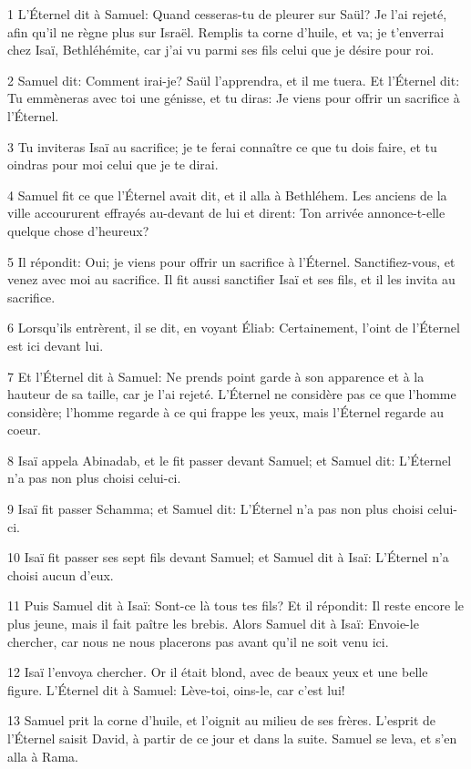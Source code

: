 \par 1 L'Éternel dit à Samuel: Quand cesseras-tu de pleurer sur Saül? Je l'ai rejeté, afin qu'il ne règne plus sur Israël. Remplis ta corne d'huile, et va; je t'enverrai chez Isaï, Bethléhémite, car j'ai vu parmi ses fils celui que je désire pour roi.
\par 2 Samuel dit: Comment irai-je? Saül l'apprendra, et il me tuera. Et l'Éternel dit: Tu emmèneras avec toi une génisse, et tu diras: Je viens pour offrir un sacrifice à l'Éternel.
\par 3 Tu inviteras Isaï au sacrifice; je te ferai connaître ce que tu dois faire, et tu oindras pour moi celui que je te dirai.
\par 4 Samuel fit ce que l'Éternel avait dit, et il alla à Bethléhem. Les anciens de la ville accoururent effrayés au-devant de lui et dirent: Ton arrivée annonce-t-elle quelque chose d'heureux?
\par 5 Il répondit: Oui; je viens pour offrir un sacrifice à l'Éternel. Sanctifiez-vous, et venez avec moi au sacrifice. Il fit aussi sanctifier Isaï et ses fils, et il les invita au sacrifice.
\par 6 Lorsqu'ils entrèrent, il se dit, en voyant Éliab: Certainement, l'oint de l'Éternel est ici devant lui.
\par 7 Et l'Éternel dit à Samuel: Ne prends point garde à son apparence et à la hauteur de sa taille, car je l'ai rejeté. L'Éternel ne considère pas ce que l'homme considère; l'homme regarde à ce qui frappe les yeux, mais l'Éternel regarde au coeur.
\par 8 Isaï appela Abinadab, et le fit passer devant Samuel; et Samuel dit: L'Éternel n'a pas non plus choisi celui-ci.
\par 9 Isaï fit passer Schamma; et Samuel dit: L'Éternel n'a pas non plus choisi celui-ci.
\par 10 Isaï fit passer ses sept fils devant Samuel; et Samuel dit à Isaï: L'Éternel n'a choisi aucun d'eux.
\par 11 Puis Samuel dit à Isaï: Sont-ce là tous tes fils? Et il répondit: Il reste encore le plus jeune, mais il fait paître les brebis. Alors Samuel dit à Isaï: Envoie-le chercher, car nous ne nous placerons pas avant qu'il ne soit venu ici.
\par 12 Isaï l'envoya chercher. Or il était blond, avec de beaux yeux et une belle figure. L'Éternel dit à Samuel: Lève-toi, oins-le, car c'est lui!
\par 13 Samuel prit la corne d'huile, et l'oignit au milieu de ses frères. L'esprit de l'Éternel saisit David, à partir de ce jour et dans la suite. Samuel se leva, et s'en alla à Rama.
